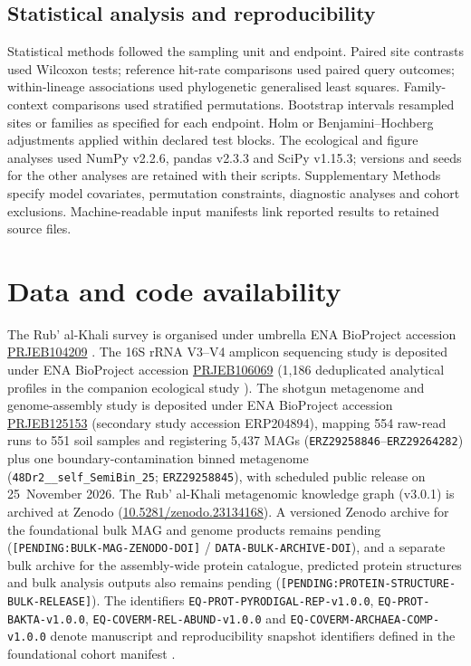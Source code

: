 \documentclass[11pt]{article}
\begin{document}
\subsection*{Statistical analysis and reproducibility}

Statistical methods followed the sampling unit and endpoint. Paired site contrasts used Wilcoxon tests; reference hit-rate comparisons used paired query outcomes; within-lineage associations used phylogenetic generalised least squares. Family-context comparisons used stratified permutations. Bootstrap intervals resampled sites or families as specified for each endpoint. Holm or Benjamini--Hochberg adjustments applied within declared test blocks. The ecological and figure analyses used NumPy v2.2.6, pandas v2.3.3 and SciPy v1.15.3; versions and seeds for the other analyses are retained with their scripts. Supplementary Methods specify model covariates, permutation constraints, diagnostic analyses and cohort exclusions. Machine-readable input manifests link reported results to retained source files.

\section*{Data and code availability}

The Rub' al-Khali survey is organised under umbrella ENA BioProject accession \href{https://www.ebi.ac.uk/ena/browser/view/PRJEB104209}{PRJEB104209} \citep{rubalkhali_datapaper}. The 16S rRNA V3--V4 amplicon sequencing study is deposited under ENA BioProject accession \href{https://www.ebi.ac.uk/ena/browser/view/PRJEB106069}{PRJEB106069} (1,186 deduplicated analytical profiles in the companion ecological study \citep{tawfiq2026companion}). The shotgun metagenome and genome-assembly study is deposited under ENA BioProject accession \href{https://www.ebi.ac.uk/ena/browser/view/PRJEB125153}{PRJEB125153} (secondary study accession ERP204894), mapping 554 raw-read runs to 551 soil samples and registering 5,437 MAGs (\texttt{ERZ29258846}--\texttt{ERZ29264282}) plus one boundary-contamination binned metagenome (\texttt{48Dr2\_\_self\_SemiBin\_25}; \texttt{ERZ29258845}), with scheduled public release on 25~November 2026. The Rub' al-Khali metagenomic knowledge graph (v3.0.1) is archived at Zenodo (\href{https://doi.org/10.5281/zenodo.23134168}{10.5281/zenodo.23134168}). A versioned Zenodo archive for the foundational bulk MAG and genome products remains pending (\texttt{[PENDING:\allowbreak BULK-\allowbreak MAG-\allowbreak ZENODO-\allowbreak DOI]} / \texttt{DATA-BULK-ARCHIVE-DOI}), and a separate bulk archive for the assembly-wide protein catalogue, predicted protein structures and bulk analysis outputs also remains pending (\texttt{[PENDING:\allowbreak PROTEIN-\allowbreak STRUCTURE-\allowbreak BULK-\allowbreak RELEASE]}). The identifiers \texttt{EQ-PROT-PYRODIGAL-REP-v1.0.0}, \texttt{EQ-PROT-BAKTA-v1.0.0}, \texttt{EQ-COVERM-REL-ABUND-v1.0.0} and \texttt{EQ-COVERM-ARCHAEA-COMP-v1.0.0} denote manuscript and reproducibility snapshot identifiers defined in the foundational cohort manifest \citep{rubalkhali_datapaper}.
\end{document}
